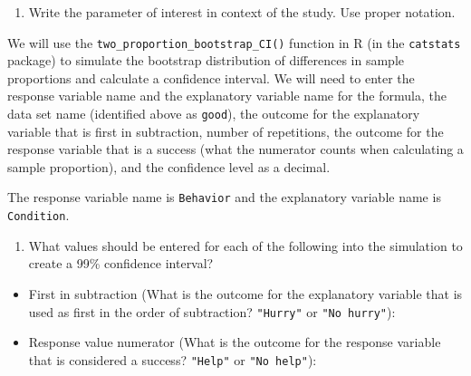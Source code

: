 \documentclass[
]{report}
\providecommand{\tightlist}{%
  \setlength{\itemsep}{0pt}\setlength{\parskip}{0pt}}
\begin{document}
\begin{enumerate}
\def\labelenumi{\arabic{enumi}.}
\setcounter{enumi}{8}
\tightlist
\item
  Write the parameter of interest in context of the study. Use proper notation.
\end{enumerate}

\vspace{1in}

We will use the \texttt{two\_proportion\_bootstrap\_CI()} function in R (in the \texttt{catstats} package) to simulate the bootstrap distribution of differences in sample proportions and calculate a confidence interval. We will need to enter the response variable name and the explanatory variable name for the formula, the data set name (identified above as \texttt{good}), the outcome for the explanatory variable that is first in subtraction, number of repetitions, the outcome for the response variable that is a success (what the numerator counts when calculating a sample proportion), and the confidence level as a decimal.

\newpage

The response variable name is \texttt{Behavior} and the explanatory variable name is \texttt{Condition}.

\begin{enumerate}
\def\labelenumi{\arabic{enumi}.}
\setcounter{enumi}{9}
\tightlist
\item
  What values should be entered for each of the following into the simulation to create a 99\% confidence interval?
  \vspace{.5mm}
\end{enumerate}

\begin{itemize}
\tightlist
\item
  First in subtraction (What is the outcome for the explanatory variable that is used as first in the order of subtraction? \texttt{"Hurry"} or \texttt{"No\ hurry"}):
\end{itemize}

\vspace{.15in}

\begin{itemize}
\tightlist
\item
  Response value numerator (What is the outcome for the response variable that is considered a success? \texttt{"Help"} or \texttt{"No\ help"}):
\end{itemize}

\vspace{.15in}
\end{document}
